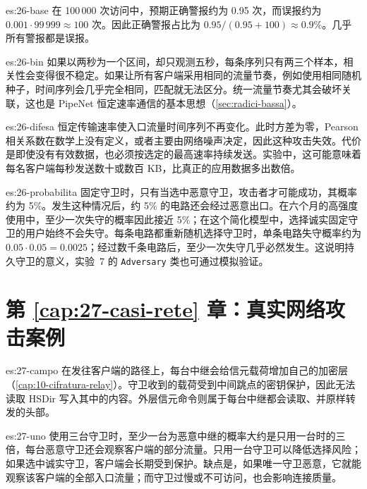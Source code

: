 \begin{soluzione}{es:26-base}
在 100\,000 次访问中，预期正确警报约为 0.95 次，而误报约为 $0.001\cdot99\,999\approx100$ 次。因此正确警报占比为 $0.95/(0.95+100)\approx0.9\%$。几乎所有警报都是误报。
\end{soluzione}

\begin{soluzione}{es:26-bin}
如果以两秒为一个区间，却只观测五秒，每条序列只有两三个样本，相关性会变得很不稳定。如果让所有客户端采用相同的流量节奏，例如使用相同随机种子，时间序列会几乎完全相同，匹配就无法区分。统一流量节奏尤其会破坏关联，这也是 PipeNet 恒定速率通信的基本思想（\cref{sec:radici-bassa}）。
\end{soluzione}

\begin{soluzione}{es:26-difesa}
恒定传输速率使入口流量时间序列不再变化。此时方差为零，Pearson 相关系数在数学上没有定义，或者主要由网络噪声决定，因此这种攻击失效。代价是即使没有有效数据，也必须按选定的最高速率持续发送。实验中，这可能意味着每名客户端每秒发送数十或数百 KB，比真正的应用数据多出数倍。
\end{soluzione}

\begin{soluzione}{es:26-probabilita}
固定守卫时，只有当选中恶意守卫，攻击者才可能成功，其概率约为 5\%。发生这种情况后，约 5\% 的电路还会经过恶意出口。在六个月的高强度使用中，至少一次失守的概率因此接近 5\%；在这个简化模型中，选择诚实固定守卫的用户始终不会失守。每条电路都重新随机选择守卫时，单条电路失守概率约为 $0.05\cdot0.05=0.0025$；经过数千条电路后，至少一次失守几乎必然发生。这说明持久守卫的意义，实验~7 的 \texttt{Adversary} 类也可通过模拟验证。
\end{soluzione}

\section*{第 \ref{cap:27-casi-rete} 章：真实网络攻击案例}

\begin{soluzione}{es:27-campo}
在发往客户端的路径上，每台中继会给信元载荷增加自己的加密层（\cref{cap:10-cifratura-relay}）。守卫收到的载荷受到中间跳点的密钥保护，因此无法读取 HSDir 写入其中的内容。外层信元命令则属于每台中继都会读取、并原样转发的头部。
\end{soluzione}

\begin{soluzione}{es:27-uno}
使用三台守卫时，至少一台为恶意中继的概率大约是只用一台时的三倍，每台恶意守卫还会观察客户端的部分流量。只用一台守卫可以降低选择风险；如果选中诚实守卫，客户端会长期受到保护。缺点是，如果唯一守卫恶意，它就能观察该客户端的全部入口流量；而守卫过慢或不可访问，也会影响连接质量。
\end{soluzione}

